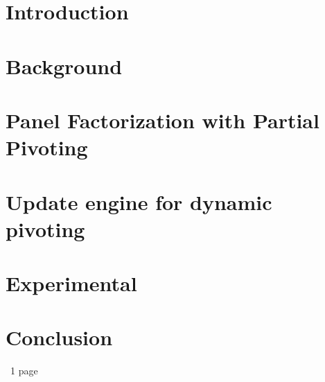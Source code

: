 \maketitle
\newpage
\null
\newpage

\abstract{
  
}

\tableofcontents
\newpage


\chapter{Introduction}\label{intro}%


\chapter{Background}\label{background}


\chapter{Panel Factorization with Partial Pivoting}\label{panel}


\chapter{Update engine for dynamic pivoting}\label{update}


\chapter{Experimental}\label{experimental}


\chapter{Conclusion}\label{conclusion}
~1 page







